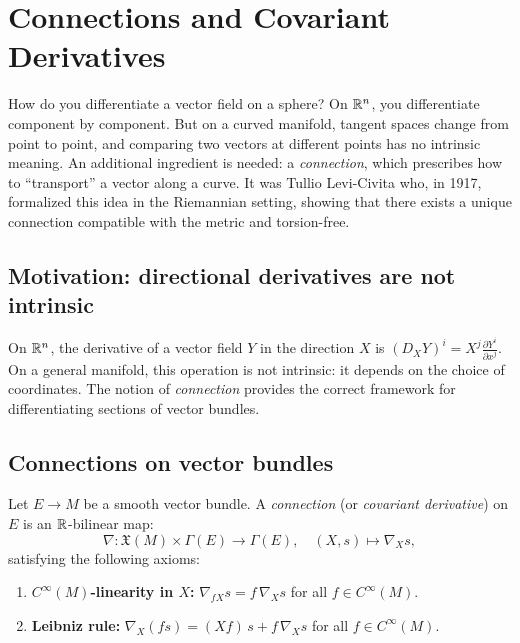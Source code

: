 \chapter{Connections and Covariant Derivatives}
\label{ch:connections}

How do you differentiate a vector field on a sphere? On $\mathbb{R}^n$, you
differentiate component by component. But on a curved manifold, tangent
spaces change from point to point, and comparing two vectors at different
points has no intrinsic meaning. An additional ingredient is needed: a
\emph{connection}, which prescribes how to ``transport'' a vector along a
curve. It was Tullio Levi-Civita who, in 1917, formalized this idea in the
Riemannian setting, showing that there exists a unique connection compatible
with the metric and torsion-free.

\section{Motivation: directional derivatives are not intrinsic}

On $\mathbb{R}^n$, the derivative of a vector field $Y$ in the direction $X$ is
$(D_X Y)^i = X^j \frac{\partial Y^i}{\partial x^j}$. On a general manifold,
this operation is not intrinsic: it depends on the choice of coordinates. The
notion of \emph{connection} provides the correct framework for differentiating
sections of vector bundles.

\section{Connections on vector bundles}

\begin{definition}
Let $E \to M$ be a smooth vector bundle. A \emph{connection} (or \emph{covariant
derivative}) on $E$ is an $\mathbb{R}$-bilinear map:
\[
    \nabla : \mathfrak{X}(M) \times \Gamma(E) \to \Gamma(E),
    \quad (X, s) \mapsto \nabla_X s,
\]
satisfying the following axioms:
\begin{enumerate}
    \item \textbf{$C^\infty(M)$-linearity in $X$:} $\nabla_{fX} s = f\, \nabla_X s$
          for all $f \in C^\infty(M)$.
    \item \textbf{Leibniz rule:} $\nabla_X(fs) = (Xf)\, s + f\, \nabla_X s$
          for all $f \in C^\infty(M)$.
\end{enumerate}
\end{definition}

